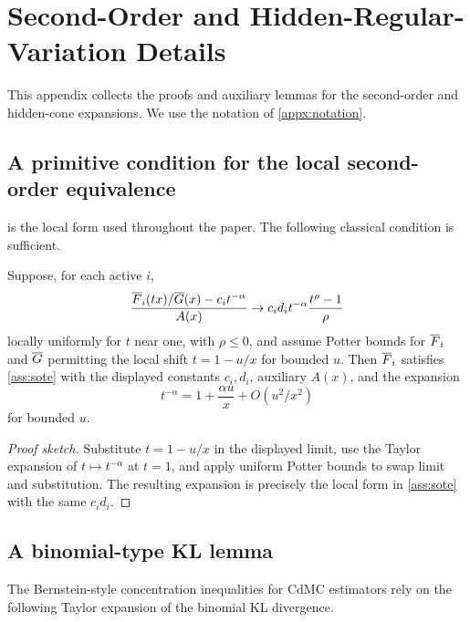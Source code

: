 \section{Second-Order and Hidden-Regular-Variation Details}
\label{appx:second-hidden}

This appendix collects the proofs and auxiliary lemmas for the second-order
and hidden-cone expansions. We use the notation of \cref{appx:notation}.

\subsection{A primitive condition for the local second-order equivalence}

 is the local form used throughout the paper. The following
classical condition is sufficient.

\begin{lemma}
\label{lem:sote-primitive}
Suppose, for each active \(i\),
\[
  \frac{\overline{F}_i(tx)/\overline{G}(x)-c_it^{-\alpha}}{A(x)}
  \to c_i d_i t^{-\alpha}\frac{t^\rho-1}{\rho}
\]
locally uniformly for \(t\) near one, with \(\rho\le 0\), and assume Potter
bounds for \(\overline{F}_i\) and \(\overline{G}\) permitting the local shift \(t=1-u/x\) for
bounded \(u\). Then \(\overline{F}_i\) satisfies \cref{ass:sote} with the displayed
constants \(c_i,d_i\), auxiliary \(A(x)\), and the expansion
\[
  t^{-\alpha}=1+\frac{\alpha u}{x}+O(u^2/x^2)
\]
for bounded \(u\).
\end{lemma}

\begin{proof}[Proof sketch]
Substitute \(t=1-u/x\) in the displayed limit, use the Taylor expansion of
\(t\mapsto t^{-\alpha}\) at \(t=1\), and apply uniform Potter bounds to swap
limit and substitution. The resulting expansion is precisely the local form in
\cref{ass:sote} with the same \(c_i d_i\).
\end{proof}

\subsection{A binomial-type KL lemma}

The Bernstein-style concentration inequalities for CdMC estimators rely on the
following Taylor expansion of the binomial KL divergence.

